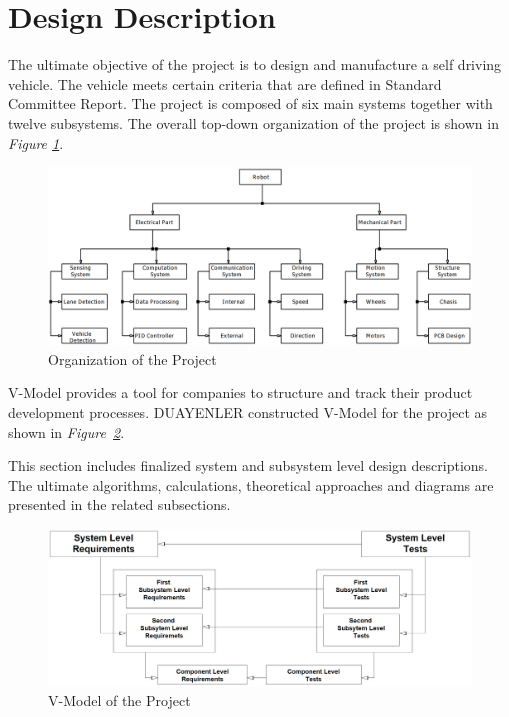\documentclass[a4paper,12pt]{article}
\begin{document}
\section{Design Description} 
The ultimate objective of the project is to design and manufacture a self driving vehicle. The vehicle meets certain criteria that are defined in Standard Committee Report. The project is composed of six main systems together with twelve subsystems. The overall top-down organization of the project is shown in \textit{Figure \ref{fig:organization}}.

\begin{figure}[h]

\includegraphics[width=\textwidth,center]{images/system}

\caption{Organization of the Project}\label{fig:organization}

\end{figure}



V-Model provides a tool for companies to structure and track their product development processes. DUAYENLER constructed V-Model for the project as shown in \textit{Figure~\ref{fig:vmodel}}. 

This section includes finalized system and subsystem level design descriptions. The ultimate algorithms, calculations, theoretical approaches and diagrams are presented in the related subsections.

\begin{figure}[h]

\includegraphics[width=\textwidth,center]{images/vModels/vmodel}

\caption{V-Model of the Project}\label{fig:vmodel}

\end{figure}
\end{document}
